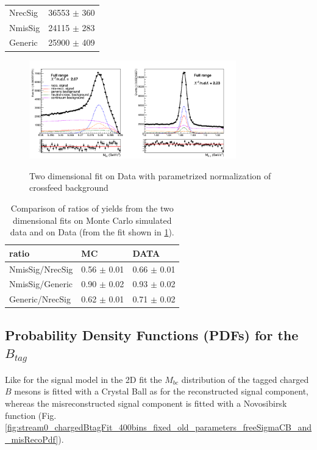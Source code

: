 \begin{tabular}{ |p{3cm}||p{3cm}|  }

 \hline
 NrecSig  &  36553 $\pm$ 360\\
 NmisSig &  24115 $\pm$ 283 \\
 Generic & 25900 $\pm$ 409\\
 \hline
\end{tabular}

 \begin{figure}[H]
  {\includegraphics[width=0.80\textwidth]{05-chargedControlSample/figs/chargedControlD0_Total_2DFit_onData_paramCrossfeedRatio.png}}
  \caption{Two dimensional fit on Data with parametrized normalization of crossfeed background}
  \label{fig:chargedControlD0_Total_2DFit_onData_paramCrossfeedRatio}
  \end{figure}
 

  \vspace{0.5 cm}
  \begin{table}
 \begin{tabular}{ |p{3cm}||p{3cm}| p{3cm}|  }
 
  \hline
  ratio        &          MC      &    DATA   \\
  \hline
  \hline
 NmisSig/NrecSig  &  0.56 $\pm$ 0.01  & 0.66 $\pm$ 0.01\\
 NmisSig/Generic  &  0.90 $\pm$ 0.02 &  0.93 $\pm$ 0.02  \\
 Generic/NrecSig & 0.62 $\pm$ 0.01 & 0.71 $\pm$ 0.02\\
  \hline
 
 \end{tabular}
  \caption{Comparison of ratios of yields from the two dimensional fits on Monte Carlo simulated data and on Data (from the fit shown in \cref{fig:chargedControlD0_Total_2DFit_onData_paramCrossfeedRatio}).} 
  \end{table}




\newpage 
\subsection{Probability Density Functions (PDFs) for the $B_{tag}$}
Like for the signal model in the 2D fit the $M_{bc}$ distribution of the tagged charged $B$ mesons is fitted with a Crystal Ball as for the reconstructed  signal component, whereas the misreconstructed signal component is fitted with a Novosibirsk function (Fig. \ref{fig:stream0_chargedBtagFit_400bins_fixed_old_parameters_freeSigmaCB_and_misRecoPdf}).

